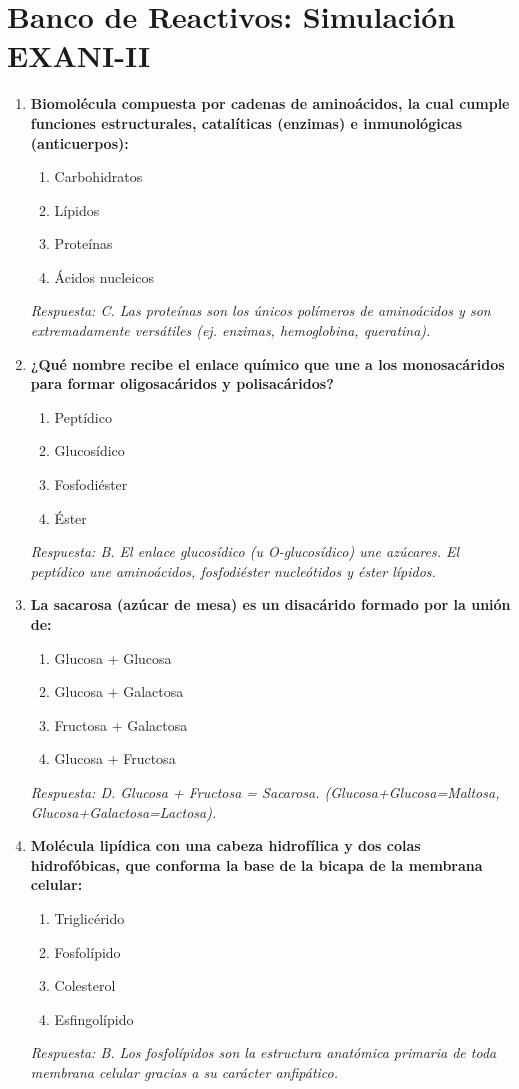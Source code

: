 \documentclass[spanish,letterpaper,oneside]{article}
\begin{document}
\newpage
\section{Banco de Reactivos: Simulación EXANI-II}
\begin{enumerate}[label=\textbf{\arabic*.}]
    \item \textbf{Biomolécula compuesta por cadenas de aminoácidos, la cual cumple funciones estructurales, catalíticas (enzimas) e inmunológicas (anticuerpos):}
    \begin{enumerate}
        \item[A)] Carbohidratos
        \item[B)] Lípidos
        \item[C)] Proteínas
        \item[D)] Ácidos nucleicos
    \end{enumerate}
    \textit{Respuesta: C. Las proteínas son los únicos polímeros de aminoácidos y son extremadamente versátiles (ej. enzimas, hemoglobina, queratina).}

    \item \textbf{¿Qué nombre recibe el enlace químico que une a los monosacáridos para formar oligosacáridos y polisacáridos?}
    \begin{enumerate}
        \item[A)] Peptídico
        \item[B)] Glucosídico
        \item[C)] Fosfodiéster
        \item[D)] Éster
    \end{enumerate}
    \textit{Respuesta: B. El enlace glucosídico (u O-glucosídico) une azúcares. El peptídico une aminoácidos, fosfodiéster nucleótidos y éster lípidos.}

    \item \textbf{La sacarosa (azúcar de mesa) es un disacárido formado por la unión de:}
    \begin{enumerate}
        \item[A)] Glucosa + Glucosa
        \item[B)] Glucosa + Galactosa
        \item[C)] Fructosa + Galactosa
        \item[D)] Glucosa + Fructosa
    \end{enumerate}
    \textit{Respuesta: D. Glucosa + Fructosa = Sacarosa. (Glucosa+Glucosa=Maltosa, Glucosa+Galactosa=Lactosa).}

    \item \textbf{Molécula lipídica con una cabeza hidrofílica y dos colas hidrofóbicas, que conforma la base de la bicapa de la membrana celular:}
    \begin{enumerate}
        \item[A)] Triglicérido
        \item[B)] Fosfolípido
        \item[C)] Colesterol
        \item[D)] Esfingolípido
    \end{enumerate}
    \textit{Respuesta: B. Los fosfolípidos son la estructura anatómica primaria de toda membrana celular gracias a su carácter anfipático.}


\end{enumerate}
\end{document}
